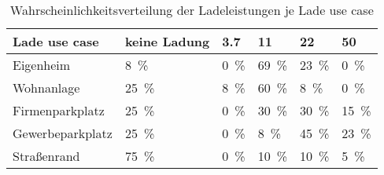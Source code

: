 {
\renewcommand{\arraystretch}{1.2}%
\begin{table}[H]
	\begin{center}
		\caption{Wahrscheinlichkeitsverteilung der Ladeleistungen je Lade use case}
		\begin{tabu} to \textwidth {X[1.7] X[1.3, r] X[1, r] X[1, r] X[1, r] X[1, r]}
			\toprule
			Lade use   case  & keine Ladung      & \SI{3.7}{\kw}    & \SI{11}{\kw}      & \SI{22}{\kw}      & \SI{50}{\kw}      \\ \midrule
			Eigenheim        & \SI{8}{\percent}  & \SI{0}{\percent} & \SI{69}{\percent} & \SI{23}{\percent} & \SI{0}{\percent}  \\
			Wohnanlage       & \SI{25}{\percent} & \SI{8}{\percent} & \SI{60}{\percent} & \SI{8}{\percent}  & \SI{0}{\percent}  \\
			Firmenparkplatz  & \SI{25}{\percent} & \SI{0}{\percent} & \SI{30}{\percent} & \SI{30}{\percent} & \SI{15}{\percent} \\
			Gewerbeparkplatz & \SI{25}{\percent} & \SI{0}{\percent} & \SI{8}{\percent}  & \SI{45}{\percent} & \SI{23}{\percent} \\
			Straßenrand      & \SI{75}{\percent} & \SI{0}{\percent} & \SI{10}{\percent} & \SI{10}{\percent} & \SI{5}{\percent}  \\ \bottomrule
		\end{tabu}
		\label{tab:UCProbability2050}
	\end{center}
	\vspace{-3mm}%
\end{table}
}